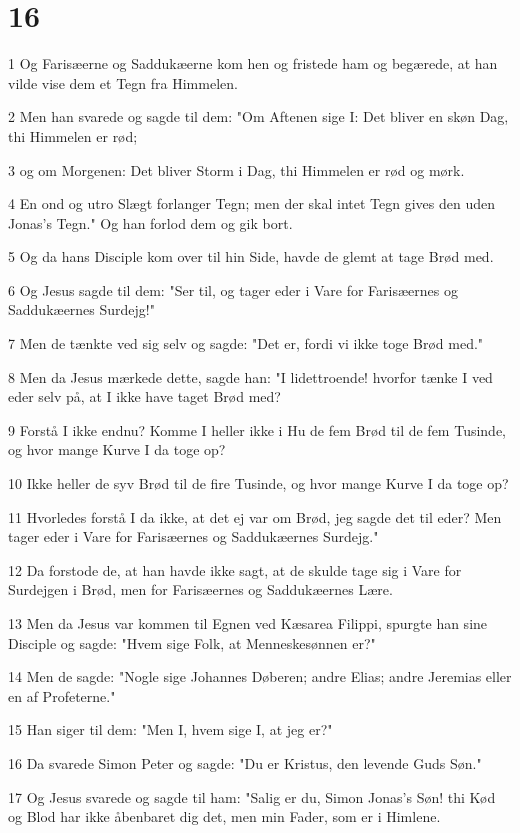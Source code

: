 \chapter{16}

\par 1 Og Farisæerne og Saddukæerne kom hen og fristede ham og begærede, at han vilde vise dem et Tegn fra Himmelen.
\par 2 Men han svarede og sagde til dem: "Om Aftenen sige I: Det bliver en skøn Dag, thi Himmelen er rød;
\par 3 og om Morgenen: Det bliver Storm i Dag, thi Himmelen er rød og mørk.
\par 4 En ond og utro Slægt forlanger Tegn; men der skal intet Tegn gives den uden Jonas's Tegn." Og han forlod dem og gik bort.
\par 5 Og da hans Disciple kom over til hin Side, havde de glemt at tage Brød med.
\par 6 Og Jesus sagde til dem: "Ser til, og tager eder i Vare for Farisæernes og Saddukæernes Surdejg!"
\par 7 Men de tænkte ved sig selv og sagde: "Det er, fordi vi ikke toge Brød med."
\par 8 Men da Jesus mærkede dette, sagde han: "I lidettroende! hvorfor tænke I ved eder selv på, at I ikke have taget Brød med?
\par 9 Forstå I ikke endnu? Komme I heller ikke i Hu de fem Brød til de fem Tusinde, og hvor mange Kurve I da toge op?
\par 10 Ikke heller de syv Brød til de fire Tusinde, og hvor mange Kurve I da toge op?
\par 11 Hvorledes forstå I da ikke, at det ej var om Brød, jeg sagde det til eder? Men tager eder i Vare for Farisæernes og Saddukæernes Surdejg."
\par 12 Da forstode de, at han havde ikke sagt, at de skulde tage sig i Vare for Surdejgen i Brød, men for Farisæernes og Saddukæernes Lære.
\par 13 Men da Jesus var kommen til Egnen ved Kæsarea Filippi, spurgte han sine Disciple og sagde: "Hvem sige Folk, at Menneskesønnen er?"
\par 14 Men de sagde: "Nogle sige Johannes Døberen; andre Elias; andre Jeremias eller en af Profeterne."
\par 15 Han siger til dem: "Men I, hvem sige I, at jeg er?"
\par 16 Da svarede Simon Peter og sagde: "Du er Kristus, den levende Guds Søn."
\par 17 Og Jesus svarede og sagde til ham: "Salig er du, Simon Jonas's Søn! thi Kød og Blod har ikke åbenbaret dig det, men min Fader, som er i Himlene.

